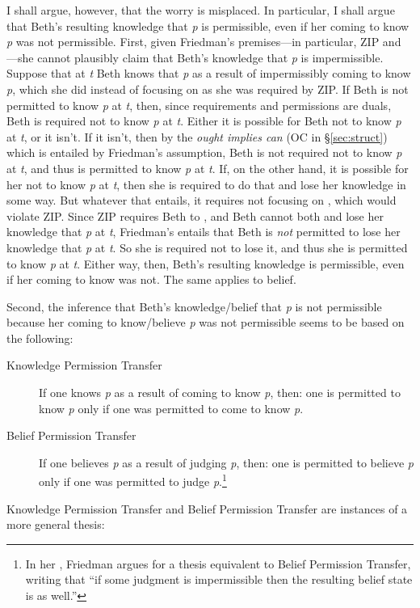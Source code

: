 \documentclass[12pt]{article}
\begin{document}
I shall argue, however, that the worry is misplaced. In particular, I shall argue that Beth's resulting knowledge that \textit{p} is permissible, even if her coming to know \textit{p} was not permissible. First, given Friedman's premises---in particular, ZIP and \opic{}---she cannot plausibly claim that Beth's knowledge that \textit{p} is impermissible. Suppose that at \textit{t} Beth knows that \textit{p} as a result of impermissibly coming to know \textit{p}, which she did instead of focusing on  as she was required by ZIP. If Beth is not permitted to know \textit{p} at \textit{t}, then, since requirements and permissions are duals, Beth is required not to know \textit{p} at \textit{t}. Either it is possible for Beth not to know \textit{p} at \textit{t}, or it isn't. If it isn't, then by the \textit{ought implies can} (OC in \S\ref{sec:struct}) which is entailed by Friedman's \opic{} assumption, Beth is not required not to know \textit{p} at \textit{t}, and thus is permitted to know \textit{p} at \textit{t}. If, on the other hand, it is possible for her not to know \textit{p} at \textit{t}, then she is required to do that and lose her knowledge in some way. But whatever that entails, it requires not focusing on , which would violate ZIP. Since ZIP requires Beth to \foc{}, and Beth cannot both \foc{} and lose her knowledge that \textit{p} at \textit{t}, Friedman's \opic{} entails that Beth is \textit{not} permitted to lose her knowledge that \textit{p} at \textit{t}. So she is required not to lose it, and thus she is permitted to know \textit{p} at \textit{t}. Either way, then, Beth's resulting knowledge is permissible, even if her coming to know was not. The same applies to belief.

Second, the inference that Beth's knowledge/belief that \textit{p} is not permissible because her coming to know/believe \textit{p} was not permissible seems to be based on the following:

\newcommand{\pp}{Permission Transfer}
\newcommand{\ppk}{Knowledge \pp{}}
\newcommand{\ppb}{Belief \pp{}}
\newcommand{\ppa}{Act-State \pp{}}
\begin{description}
    \item[\ppk] If one knows \textit{p} as a result of coming to know \textit{p}, then: one is permitted to know \textit{p} only if one was permitted to come to know \textit{p}.
    \item[\ppb] If one believes \textit{p} as a result of judging \textit{p}, then: one is permitted to believe \textit{p} only if one was permitted to judge \textit{p}.\footnote{In her \parencite*[p.~689f]{friedman_teleological_2019}, Friedman argues for a thesis equivalent to \ppb{}, writing that ``if some judgment is impermissible then the resulting belief state is as well.''}
\end{description}
%
\ppk{} and \ppb{} are instances of a more general thesis:
\end{document}
